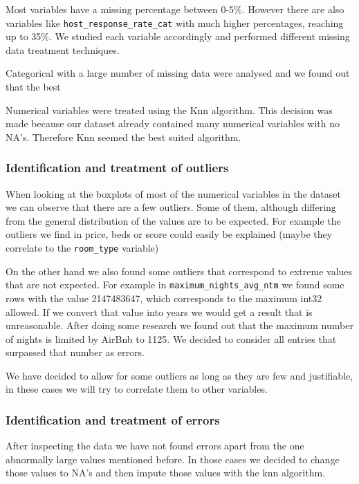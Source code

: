 Most variables have a missing percentage between 0-5\%. However there are also
variables like \texttt{host\_response\_rate\_cat} with much higher percentages,
reaching up to 35\%. We studied each variable accordingly and performed different missing data treatment techniques.

Categorical with a large number of missing data were analysed and we found out that the best 

Numerical variables were treated using the Knn algorithm. This decision was made because our dataset already contained many numerical variables with no NA's. Therefore Knn seemed the best suited algorithm.

\subsubsection{Identification and treatment of outliers}

When looking at the boxplots of most of the numerical variables in the dataset
we can observe that there are a few outliers. Some of them, although differing
from the general distribution of the values are to be expected. For example the
outliers we find in price, beds or score could easily be explained (maybe they
correlate to the \texttt{room\_type} variable)

On the other hand we also found some outliers that correspond to extreme values
that are not expected. For example in \texttt{maximum\_nights\_avg\_ntm} we
found some rows with the value 2147483647, which corresponds to the maximum
int32 allowed. If we convert that value into years we would get a result that is
unreasonable. After doing some research we found out that the maximum number of nights is limited by AirBnb to 1125. We decided to consider all entries that surpassed that number as errors. 

We have decided to allow for some outliers as long as they are few and
justifiable, in these cases we will try to correlate them to other variables.

\subsubsection{Identification and treatment of errors}

After inspecting the data we have not found errors apart from the one abnormally
large values mentioned before. In those cases we decided to change those values to NA's and then impute those values with the knn algorithm.

